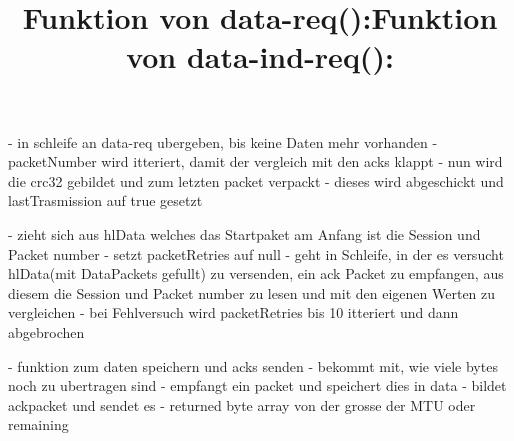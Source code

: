 \documentclass [12pt]{article}
\begin{document}
- in schleife an data-req ubergeben, bis keine Daten mehr vorhanden\newline
- packetNumber wird itteriert, damit der vergleich mit den acks klappt\newline
- nun wird die crc32 gebildet und zum letzten packet verpackt\newline
- dieses wird abgeschickt und lastTrasmission auf true gesetzt\newline\newline
\title{Funktion von data-req():}
\maketitle
\newline\newline
- zieht sich aus hlData welches das Startpaket am Anfang ist die Session und Packet number\newline
- setzt packetRetries auf null\newline
- geht in Schleife, in der es versucht hlData(mit DataPackets gefullt) zu versenden, ein ack Packet zu empfangen, aus diesem die Session und Packet number zu lesen und mit den eigenen Werten zu vergleichen\newline
- bei Fehlversuch wird packetRetries bis 10 itteriert und dann abgebrochen\newline\newline
\title{Funktion von data-ind-req():}
\maketitle
\newline\newline
- funktion zum daten speichern und acks senden\newline
- bekommt mit, wie viele bytes noch zu ubertragen sind\newline
- empfangt ein packet und speichert dies in data\newline
- bildet ackpacket und sendet es \newline
- returned byte array von der grosse der MTU oder remaining\newline\newline

\newpage
\end{document}
